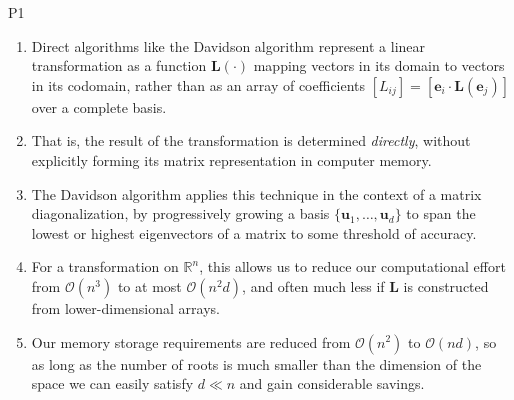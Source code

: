 P1
\begin{enumerate}
    \item
        Direct algorithms like the Davidson algorithm represent a linear
        transformation as a function
        \(
            \mathbf{L}(\cdot)
        \)
        mapping vectors in its domain to vectors in its codomain, rather than as
        an array of coefficients
        \(
            [L_{ij}]
            =
            [\mathbf{e}_i \cdot \mathbf{L}(\mathbf{e}_j)]
        \)
        over a complete basis.
    \item
        That is, the result of the transformation is determined {\itshape
        directly}, without explicitly forming its matrix representation in
        computer memory.
    \item
        The Davidson algorithm applies this technique in the context of a matrix
        diagonalization, by progressively growing a basis
        \(
            \{\mathbf{u}_1, \ldots,\mathbf{u}_d\}
        \)
        to span the lowest or highest eigenvectors of a matrix to some threshold
        of accuracy.
    \item
        For a transformation on \(\mathbb{R}^n\), this allows us to reduce our
        computational effort from \(\mathcal{O}(n^3)\) to at most
        \(\mathcal{O}(n^2 d)\), and often much less if \(\mathbf{L}\) is
        constructed from lower-dimensional arrays.
    \item
        Our memory storage requirements are reduced from \(\mathcal{O}(n^2)\) to
        \(\mathcal{O}(nd)\), so as long as the number of roots is much smaller
        than the dimension of the space we can easily satisfy \(d \ll n\) and
        gain considerable savings.
\end{enumerate}

